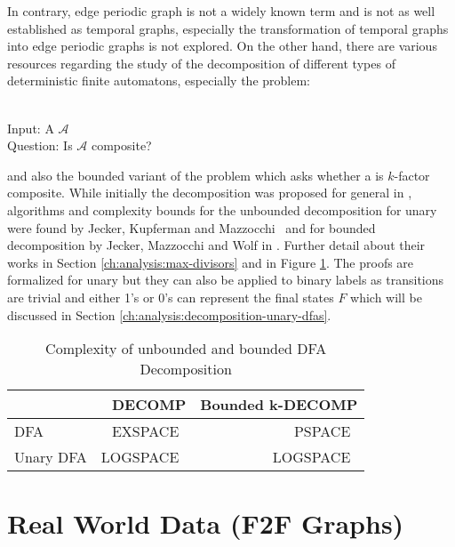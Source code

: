 In contrary, edge periodic graph is not a widely known term and is not as well established as temporal graphs, especially the transformation of temporal graphs into edge periodic graphs is not explored.
On the other hand, there are various resources regarding the study of the decomposition of different types of deterministic finite automatons, especially the problem:
\begin{defn}{\ \\}
	Input: A \DFA $\mathcal{A}$\\
	Question: Is $\mathcal{A}$ composite?
\end{defn}
and also the bounded variant of the problem which asks whether a \DFA is $k$-factor composite. While initially the decomposition was proposed for general \DFAs in \cite{prime-languages}, algorithms and complexity bounds for the unbounded decomposition for unary \DFAs were found by Jecker, Kupferman and Mazzocchi~\cite{unara-prime-languages} and for bounded decomposition by Jecker, Mazzocchi and Wolf in \cite{DBLP:journals/corr/abs-2107-04683}.
Further detail about their works in Section \ref{ch:analysis:max-divisors} and in Figure \ref{tab:dfa-decomp-complexity}.
The proofs are formalized for unary \DFAs but they can also be applied to binary labels as transitions are trivial and either 1's or 0's can represent the final states $F$ which will be discussed in Section \ref{ch:analysis:decomposition-unary-dfas}.
\begin{table}[h]
	\centering
	\begin{tabular}{l|rr}
		&  DECOMP & Bounded k-DECOMP  \\
		\hline
		DFA & EXSPACE~\cite{prime-languages} & PSPACE~\cite{DBLP:journals/corr/abs-2107-04683}  \\
		Unary DFA & LOGSPACE~\cite{unara-prime-languages} &  LOGSPACE~\cite{DBLP:journals/corr/abs-2107-04683}
	\end{tabular}
	\caption{Complexity of unbounded and bounded DFA Decomposition}
	\label{tab:dfa-decomp-complexity}
\end{table}


\section{Real World Data (F2F Graphs)}
\label{ch:prelimiaries:real-world-data}

